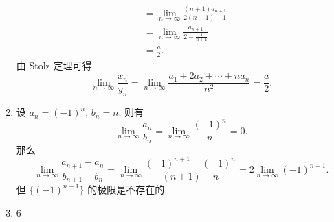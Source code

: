 \begin{enumerate}
\begin{align*}
                                                                 &= \lim_{n\to\infty}\frac{(n+1)a_{n+1}}{2(n+1) - 1} \\
                                                                 &= \lim_{n\to\infty}\frac{a_{n+1}}{2 - \frac{1}{n+1}} \\
                                                                 &= \frac a2.
        \end{align*}
        由 Stolz 定理可得
        \[
            \lim_{n\to\infty}\frac{x_n}{y_n} = \lim_{n\to\infty}\frac{a_1 + 2a_2 + \cdots + na_n}{n^2} = \frac a2.    
        \]
    \item %
        设 $a_n = (-1)^{n}$, $b_n = n$, 则有
        \[
            \lim_{n\to\infty}\frac{a_n}{b_n} = \lim_{n\to\infty}\frac{(-1)^n}{n} = 0.    
        \]
        那么
        \[
            \lim_{n\to\infty}\frac{a_{n+1} - a_n}{b_{n+1} - b_n} = \lim_{n\to\infty}\frac{(-1)^{n+1} - (-1)^n}{(n+1) - n} = 2\lim_{n\to\infty}(-1)^{n+1}.    
        \]
        但 $\{(-1)^{n+1}\}$ 的极限是不存在的. 
    \item 6
\end{enumerate}

% 

